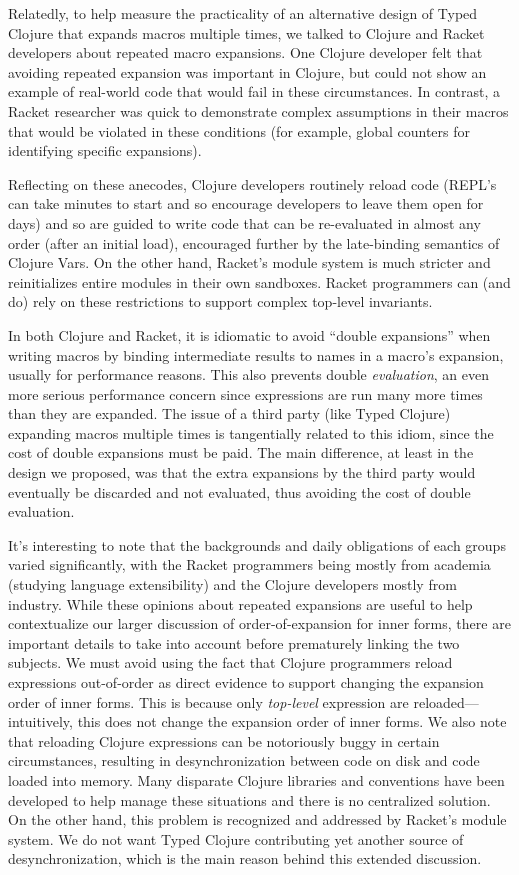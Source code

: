 Relatedly, to help measure the practicality of an alternative design of Typed Clojure
that expands macros multiple times,
we talked to Clojure and Racket developers about repeated macro expansions.
One Clojure developer felt
that avoiding repeated expansion was important in Clojure,
but could not show an example of real-world code
that would fail in these circumstances.
In contrast, a Racket researcher was quick to demonstrate complex
assumptions in their macros that would be violated in these
conditions (for example, global counters for identifying specific expansions).

Reflecting on these anecodes, Clojure developers routinely reload
code (REPL's can take minutes to start and so encourage developers to leave
them open for days)
and so are guided to write code that can be re-evaluated
in almost any order (after an initial load), encouraged further by the late-binding semantics
of Clojure Vars.
On the other hand, Racket's module system is much stricter and reinitializes
entire modules in their own sandboxes. Racket programmers can (and do) rely
on these restrictions to support complex top-level invariants.

In both Clojure and Racket, it is idiomatic to avoid ``double expansions''
when writing macros by binding intermediate results to names in a macro's
expansion, usually
for performance reasons.
This also prevents double \emph{evaluation}, an even more serious performance concern
since expressions are run many more times than they are
expanded.
The issue of a third party (like Typed Clojure) expanding macros
multiple times is tangentially related to this idiom, since
the cost of double expansions must be paid.
The main difference, at least in the design we proposed,
was that the extra expansions by the third party would eventually be discarded
and not evaluated, thus avoiding the cost of double evaluation.

It's interesting to note that the backgrounds and daily obligations of each groups varied significantly,
with the Racket programmers being mostly from academia (studying language extensibility)
and the Clojure developers mostly from industry.
While these opinions about repeated expansions
are useful to help contextualize our larger discussion of
order-of-expansion for inner forms,
there are important details to take into account
before prematurely
linking the two subjects.
We must avoid using the fact that Clojure programmers
reload expressions out-of-order as direct evidence 
to support changing the expansion order of inner forms.
This is because only \emph{top-level} expression are reloaded---intuitively,
this does not change the expansion order of inner forms.
We also note that reloading Clojure expressions can be notoriously
buggy in certain circumstances, resulting in desynchronization
between code on disk and code loaded into memory.
Many disparate Clojure libraries and conventions have been developed to
help manage these situations and there is no centralized solution.
On the other hand, this problem is recognized and addressed by Racket's module system.
We do not want Typed Clojure contributing yet another source of
desynchronization, which is the main reason behind this extended discussion.

